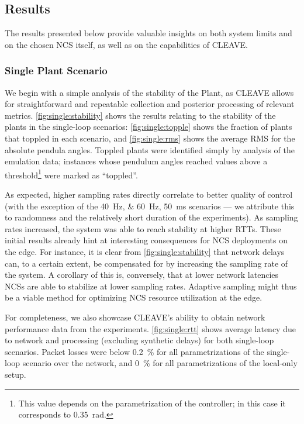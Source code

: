 \subsection{Results}\label{ssec:results}

The results presented below provide valuable insights on both system limits and on the chosen \ac{NCS} itself, as well as on the capabilities of \ac{CLEAVE}.

\subsubsection{Single Plant Scenario}

We begin with a simple analysis of the stability of the Plant, as \ac{CLEAVE} allows for straightforward and repeatable collection and posterior processing of relevant metrics.  
\cref{fig:single:stability} shows the results relating to the stability of the plants in the single-loop scenarios:
\cref{fig:single:topple} shows the fraction of plants that toppled in each scenario, and \cref{fig:single:rms} shows the average \ac{RMS} for the absolute pendula angles.
Toppled plants were identified simply by analysis of the emulation data; instances whose pendulum angles reached values above a threshold\footnote{This value depends on the parametrization of the controller; in this case it corresponds to \SI{0.35}{\radian}.} were marked as ``toppled''.

As expected, higher sampling rates directly correlate to better quality of control (with the exception of the \SIlist{40;60}{\hertz}, \SI{50}{\milli\second} scenarios --- we attribute this to randomness and the relatively short duration of the experiments).
As sampling rates increased, the system was able to reach stability at higher \acp{RTT}.
These initial results already hint at interesting consequences for \ac{NCS} deployments on the edge.
For instance, it is clear from \cref{fig:single:stability} that network delays can, to a certain extent, be compensated for by increasing the sampling rate of the system.
A corollary of this is, conversely, that at lower network latencies \acp{NCS} are able to stabilize at lower sampling rates.
Adaptive sampling might thus be a viable method for optimizing \ac{NCS} resource utilization at the edge.

For completeness, we also showcase \ac{CLEAVE}'s ability to obtain network performance data from the experiments.
\cref{fig:single:rtt} shows average latency due to network and processing (excluding synthetic delays) for both single-loop scenarios.
Packet losses were below \SI{0.2}{\percent} for all parametrizations of the single-loop scenario over the network, and \SI{0}{\percent} for all parametrizations of the local-only setup.

